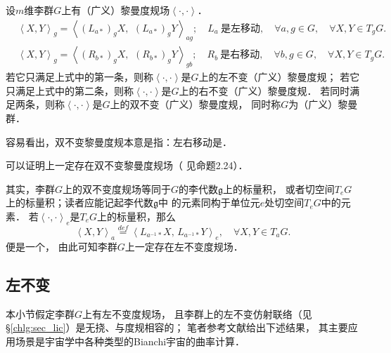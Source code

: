 \begin{definition}
    设$m$维李群$G$上有（广义）黎曼度规场$\left<\cdot,\cdot \right>$．
    \begin{align*}
        &\left<X,Y\right>_{g} = \left<(L_{a*})_g X,\,\ (L_{a*})_g Y \right>_{ag};
        \quad L_{a} \  \text{是左移动},\quad \forall a,g\in G, \quad \forall X,Y \in T_g G. \\
        &\left<X,Y\right>_{g} = \left<(R_{b*})_g X,\,\ (R_{b*})_g Y \right>_{gb};
        \quad R_{b} \  \text{是右移动} ,\quad \forall b,g\in G, \quad \forall X,Y \in T_g G. 
    \end{align*}
    若它只满足上式中的第一条，则称$\left<\cdot,\cdot \right>$是$G$上的{\heiti 左不变（广义）黎曼度规}；
    若它只满足上式中的第二条，则称$\left<\cdot,\cdot \right>$是$G$上的{\heiti 右不变（广义）黎曼度规}．
    若同时满足两条，则称$\left<\cdot,\cdot \right>$是$G$上的{\heiti 双不变（广义）黎曼度规}，
    同时称$G$为{\heiti （广义）黎曼群}．
\end{definition}
容易看出，双不变黎曼度规本意是指：左右移动是．


可以证明上一定存在双不变黎曼度规场（ 见\parencite[\S 2.2]{Alexandrino-2015}命题2.24）．

其实，李群$G$上的双不变度规场等同于$G$的李代数$\mathfrak{g}$上的标量积，
或者切空间$T_e G$上的标量积；读者应能记起李代数$\mathfrak{g}$中
的元素同构于单位元$e$处切空间$T_e G$中的元素．
若$\left<\cdot,\cdot \right>_e$是$T_e G$上的标量积，那么
\begin{equation}\label{chlg:eqn_left-invariant-metric}
    \left<X,Y\right>_a \overset{def}{=} 
    \left<L_{a^{-1}*} X,\, L_{a^{-1}*} Y \right>_e, 
    \quad \forall X,Y \in T_a G.
\end{equation}
便是一个，
由此可知李群$G$上一定存在左不变度规场．

\subsection{左不变}
本小节假定李群$G$上有左不变度规场，
且李群上的左不变仿射联络（见\S\ref{chlg:sec_lic}）是无挠、与度规相容的；
笔者参考文献\parencite{Milnor-1976}给出下述结果，
其主要应用场景是宇宙学中各种类型的Bianchi宇宙的曲率计算．







